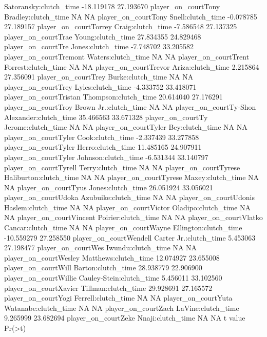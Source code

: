 \documentclass[
  landscape]{article}
\begin{document}
Satoransky:clutch\_time -18.119178 27.193670 player\_on\_courtTony
Bradley:clutch\_time NA NA player\_on\_courtTony Snell:clutch\_time
-0.078785 27.189157 player\_on\_courtTorrey Craig:clutch\_time -7.586548
27.137325 player\_on\_courtTrae Young:clutch\_time 27.834355 24.829468
player\_on\_courtTre Jones:clutch\_time -7.748702 33.205582
player\_on\_courtTremont Waters:clutch\_time NA NA
player\_on\_courtTrent Forrest:clutch\_time NA NA
player\_on\_courtTrevor Ariza:clutch\_time 2.215864 27.356091
player\_on\_courtTrey Burke:clutch\_time NA NA player\_on\_courtTrey
Lyles:clutch\_time -4.333752 33.418071 player\_on\_courtTristan
Thompson:clutch\_time 20.614040 27.176291 player\_on\_courtTroy Brown
Jr.:clutch\_time NA NA player\_on\_courtTy-Shon Alexander:clutch\_time
35.466563 33.671328 player\_on\_courtTy Jerome:clutch\_time NA NA
player\_on\_courtTyler Bey:clutch\_time NA NA player\_on\_courtTyler
Cook:clutch\_time -2.337439 33.277858 player\_on\_courtTyler
Herro:clutch\_time 11.485165 24.907911 player\_on\_courtTyler
Johnson:clutch\_time -6.531344 33.140797 player\_on\_courtTyrell
Terry:clutch\_time NA NA player\_on\_courtTyrese Haliburton:clutch\_time
NA NA player\_on\_courtTyrese Maxey:clutch\_time NA NA
player\_on\_courtTyus Jones:clutch\_time 26.051924 33.056021
player\_on\_courtUdoka Azubuike:clutch\_time NA NA
player\_on\_courtUdonis Haslem:clutch\_time NA NA
player\_on\_courtVictor Oladipo:clutch\_time NA NA
player\_on\_courtVincent Poirier:clutch\_time NA NA
player\_on\_courtVlatko Cancar:clutch\_time NA NA player\_on\_courtWayne
Ellington:clutch\_time -10.559279 27.258550 player\_on\_courtWendell
Carter Jr.:clutch\_time 5.453063 27.198477 player\_on\_courtWes
Iwundu:clutch\_time NA NA player\_on\_courtWesley Matthews:clutch\_time
12.074927 23.655008 player\_on\_courtWill Barton:clutch\_time 28.938779
22.906900 player\_on\_courtWillie Cauley-Stein:clutch\_time 5.456011
33.102560 player\_on\_courtXavier Tillman:clutch\_time 29.928691
27.165572 player\_on\_courtYogi Ferrell:clutch\_time NA NA
player\_on\_courtYuta Watanabe:clutch\_time NA NA player\_on\_courtZach
LaVine:clutch\_time 9.265999 23.682694 player\_on\_courtZeke
Nnaji:clutch\_time NA NA t value Pr(\textgreater\textbar t\textbar)\\
\end{document}
